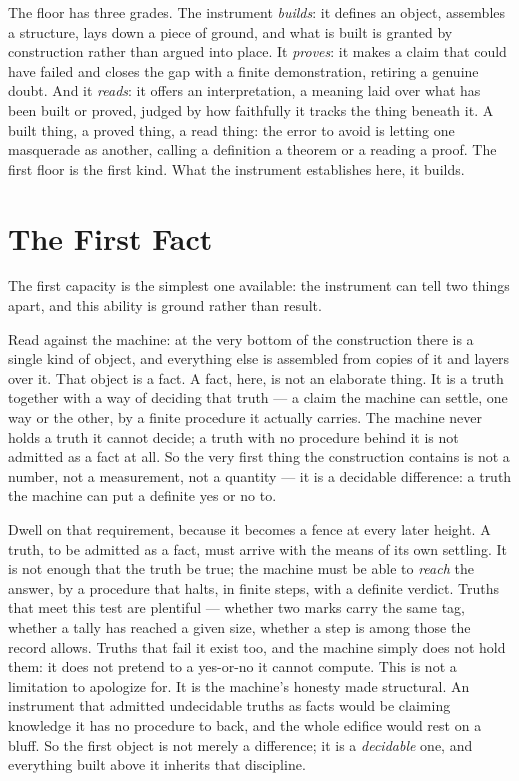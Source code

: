 The floor has three grades. The instrument \emph{builds}: it defines an object, assembles a structure, lays down a
piece of ground, and what is built is granted by construction rather than argued into place. It \emph{proves}: it
makes a claim that could have failed and closes the gap with a finite demonstration, retiring a genuine doubt. And
it \emph{reads}: it offers an interpretation, a meaning laid over what has been built or proved, judged by how
faithfully it tracks the thing beneath it. A built thing, a proved thing, a read thing: the error to avoid is
letting one masquerade as another, calling a definition a theorem or a reading a proof. The first floor is the
first kind. What the instrument establishes here, it builds.

\section{The First Fact}

The first capacity is the simplest one available: the instrument can tell two things apart, and this ability is
ground rather than result.

Read against the machine: at the very bottom of the construction there is a single kind of object, and everything
else is assembled from copies of it and layers over it. That object is a fact. A fact,
here, is not an elaborate thing. It is a truth together with a way of deciding that truth --- a claim the machine
can settle, one way or the other, by a finite procedure it actually carries. The machine never holds a truth it
cannot decide; a truth with no procedure behind it is not admitted as a fact at all. So the very first thing the
construction contains is not a number, not a measurement, not a quantity --- it is a decidable difference: a
truth the machine can put a definite yes or no to.

Dwell on that requirement, because it becomes a fence at every later height. A truth, to be admitted as a fact,
must arrive with the means of its own settling. It is not enough that the truth be true; the machine must be able
to \emph{reach} the answer, by a procedure that halts, in finite steps, with a definite verdict. Truths that meet
this test are plentiful --- whether two marks carry the same tag, whether a tally has reached a given size,
whether a step is among those the record allows. Truths that fail it exist too, and the machine simply does not
hold them: it does not pretend to a yes-or-no it cannot compute. This is not a limitation to apologize for. It is
the machine's honesty made structural. An instrument that admitted undecidable truths as facts would be claiming
knowledge it has no procedure to back, and the whole edifice would rest on a bluff. So the first object is not
merely a difference; it is a \emph{decidable} one, and everything built above it inherits that discipline.

